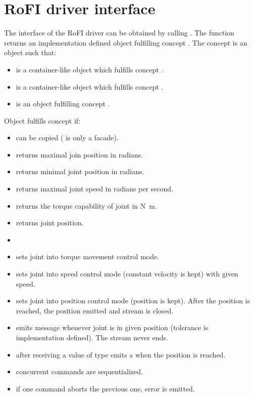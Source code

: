 \chapter{RoFI driver interface}\label{chap:rofi_interface}

The interface of the RoFI driver can be obtained by calling
. The
function returns an implementation defined object fulfilling concept
. The  concept is an object such that:
\begin{itemize}
    \item {} is a container-like object which
     fulfills concept .
    \item {} is a container-like object which
     fulfills concept .
    \item {} is an object fulfilling concept .
\end{itemize}

\noindent Object  fulfills concept  if:
\begin{itemize}
    \item {} can be copied ( is only a facade).
    \item {} returns maximal join position in
    radians.
    \item {} returns minimal joint position
    in radians.
    \item {} returns maximal joint speed
    in radians per second.
    \item {} returns the
    torque capability of joint in \si{\newton\meter}.
    \item {} returns joint position.
    \item {}
    \item {} sets joint into
    torque movement control mode.
    \item {} sets joint into
    speed control mode (constant velocity is kept) with given speed.
    \item {}
    sets joint into position control mode (position is kept). After the position
    is reached, the position emitted and stream is closed.
    \item {} emits
    message whenever joint is in given position (tolerance is implementation
    defined). The stream never ends.
    \item {}
    after receiving a value of type  emits a  when the
    position is reached.
    \item concurrent commands are sequentialized.
    \item if one command aborts the previous one, error is emitted.
\end{itemize}

